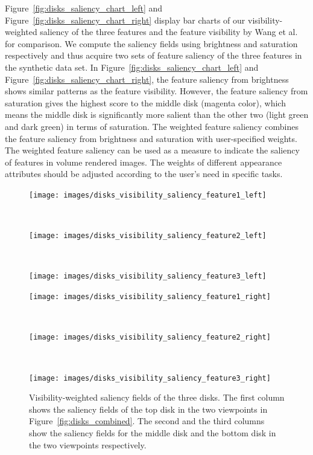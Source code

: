 Figure~\ref{fig:disks_saliency_chart_left} and Figure~\ref{fig:disks_saliency_chart_right} display bar charts of our visibility-weighted saliency of the three features and the feature visibility by Wang et al. \cite{wang_efficient_2011} for comparison.
We compute the saliency fields using brightness and saturation respectively and thus acquire two sets of feature saliency of the three features in the synthetic data set.
In Figure~\ref{fig:disks_saliency_chart_left} and Figure~\ref{fig:disks_saliency_chart_right}, the feature saliency from brightness shows similar patterns as the feature visibility. However, the feature saliency from saturation gives the highest score to the middle disk (magenta color), which means the middle disk is significantly more salient than the other two (light green and dark green) in terms of saturation. The weighted feature saliency combines the feature saliency from brightness and saturation with user-specified weights. 
The weighted feature saliency can be used as a measure to indicate the saliency of features in volume rendered images.
The weights of different appearance attributes should be adjusted according to the user's need in specific tasks.

\begin{figure}
	\centering
	\begin{minipage}{.15\textwidth}
		\texttt{[image: images/disks\_visibility\_saliency\_feature1\_left]}
	\end{minipage}~
	\begin{minipage}{.15\textwidth}
		\texttt{[image: images/disks\_visibility\_saliency\_feature2\_left]}
	\end{minipage}~
	\begin{minipage}{.15\textwidth}
		\texttt{[image: images/disks\_visibility\_saliency\_feature3\_left]}
	\end{minipage}
	\begin{minipage}{.15\textwidth}
		\texttt{[image: images/disks\_visibility\_saliency\_feature1\_right]}
	\end{minipage}~
	\begin{minipage}{.15\textwidth}
		\texttt{[image: images/disks\_visibility\_saliency\_feature2\_right]}
	\end{minipage}~
	\begin{minipage}{.15\textwidth}
		\texttt{[image: images/disks\_visibility\_saliency\_feature3\_right]}
	\end{minipage}
	\caption{Visibility-weighted saliency fields of the three disks. The first column shows the saliency fields of the top disk in the two viewpoints in Figure~\ref{fig:disks_combined}. The second and the third columns show the saliency fields for the middle disk and the bottom disk in the two viewpoints respectively.}
	\label{fig:disks_visibility_saliency_fields}
\end{figure}

